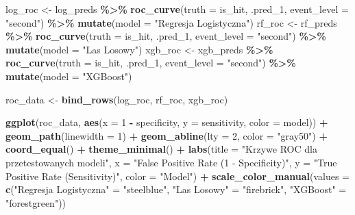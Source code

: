 \documentclass[
]{article}
\newenvironment{Shaded}{\begin{snugshade}}{\end{snugshade}}
\newcommand{\AttributeTok}[1]{\textcolor[rgb]{0.13,0.29,0.53}{#1}}
\newcommand{\DecValTok}[1]{\textcolor[rgb]{0.00,0.00,0.81}{#1}}
\newcommand{\FunctionTok}[1]{\textcolor[rgb]{0.13,0.29,0.53}{\textbf{#1}}}
\newcommand{\NormalTok}[1]{#1}
\newcommand{\OtherTok}[1]{\textcolor[rgb]{0.56,0.35,0.01}{#1}}
\newcommand{\SpecialCharTok}[1]{\textcolor[rgb]{0.81,0.36,0.00}{\textbf{#1}}}
\newcommand{\StringTok}[1]{\textcolor[rgb]{0.31,0.60,0.02}{#1}}
\begin{document}
\begin{Shaded}
\begin{Highlighting}[]
\NormalTok{log\_roc }\OtherTok{\textless{}{-}}\NormalTok{ log\_preds }\SpecialCharTok{\%\textgreater{}\%} \FunctionTok{roc\_curve}\NormalTok{(}\AttributeTok{truth =}\NormalTok{ is\_hit, .pred\_1, }\AttributeTok{event\_level =} \StringTok{"second"}\NormalTok{) }\SpecialCharTok{\%\textgreater{}\%} \FunctionTok{mutate}\NormalTok{(}\AttributeTok{model =} \StringTok{"Regresja Logistyczna"}\NormalTok{)}
\NormalTok{rf\_roc }\OtherTok{\textless{}{-}}\NormalTok{ rf\_preds }\SpecialCharTok{\%\textgreater{}\%} \FunctionTok{roc\_curve}\NormalTok{(}\AttributeTok{truth =}\NormalTok{ is\_hit, .pred\_1, }\AttributeTok{event\_level =} \StringTok{"second"}\NormalTok{) }\SpecialCharTok{\%\textgreater{}\%} \FunctionTok{mutate}\NormalTok{(}\AttributeTok{model =} \StringTok{"Las Losowy"}\NormalTok{)}
\NormalTok{xgb\_roc }\OtherTok{\textless{}{-}}\NormalTok{ xgb\_preds }\SpecialCharTok{\%\textgreater{}\%} \FunctionTok{roc\_curve}\NormalTok{(}\AttributeTok{truth =}\NormalTok{ is\_hit, .pred\_1, }\AttributeTok{event\_level =} \StringTok{"second"}\NormalTok{) }\SpecialCharTok{\%\textgreater{}\%} \FunctionTok{mutate}\NormalTok{(}\AttributeTok{model =} \StringTok{"XGBoost"}\NormalTok{)}

\NormalTok{roc\_data }\OtherTok{\textless{}{-}} \FunctionTok{bind\_rows}\NormalTok{(log\_roc, rf\_roc, xgb\_roc)}

\FunctionTok{ggplot}\NormalTok{(roc\_data, }\FunctionTok{aes}\NormalTok{(}\AttributeTok{x =} \DecValTok{1} \SpecialCharTok{{-}}\NormalTok{ specificity, }\AttributeTok{y =}\NormalTok{ sensitivity, }\AttributeTok{color =}\NormalTok{ model)) }\SpecialCharTok{+}
  \FunctionTok{geom\_path}\NormalTok{(}\AttributeTok{linewidth =} \DecValTok{1}\NormalTok{) }\SpecialCharTok{+}
  \FunctionTok{geom\_abline}\NormalTok{(}\AttributeTok{lty =} \DecValTok{2}\NormalTok{, }\AttributeTok{color =} \StringTok{"gray50"}\NormalTok{) }\SpecialCharTok{+}
  \FunctionTok{coord\_equal}\NormalTok{() }\SpecialCharTok{+}
  \FunctionTok{theme\_minimal}\NormalTok{() }\SpecialCharTok{+}
  \FunctionTok{labs}\NormalTok{(}\AttributeTok{title =} \StringTok{"Krzywe ROC dla przetestowanych modeli"}\NormalTok{,}
       \AttributeTok{x =} \StringTok{"False Positive Rate (1 {-} Specificity)"}\NormalTok{,}
       \AttributeTok{y =} \StringTok{"True Positive Rate (Sensitivity)"}\NormalTok{,}
       \AttributeTok{color =} \StringTok{"Model"}\NormalTok{) }\SpecialCharTok{+}
  \FunctionTok{scale\_color\_manual}\NormalTok{(}\AttributeTok{values =} \FunctionTok{c}\NormalTok{(}\StringTok{"Regresja Logistyczna"} \OtherTok{=} \StringTok{"steelblue"}\NormalTok{, }\StringTok{"Las Losowy"} \OtherTok{=} \StringTok{"firebrick"}\NormalTok{, }\StringTok{"XGBoost"} \OtherTok{=} \StringTok{"forestgreen"}\NormalTok{))}
\end{Highlighting}
\end{Shaded}
\end{document}
